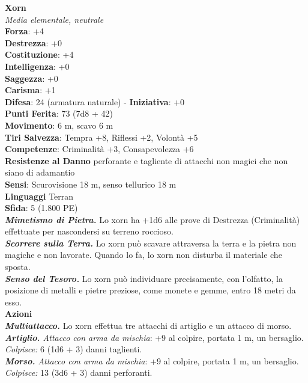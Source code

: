 \begin{multicols}{2}
\medskip\textbf{Xorn}\\
\emph{Media elementale, neutrale}\\
\textbf{Forza}: +4\\
\textbf{Destrezza}: +0\\
\textbf{Costituzione}: +4\\
\textbf{Intelligenza}: +0\\
\textbf{Saggezza}: +0\\
\textbf{Carisma}: +1\\
\textbf{Difesa}: 24 (armatura naturale) - \textbf{Iniziativa}: +0\\
\textbf{Punti Ferita}: 73 (7d8 + 42)\\
\textbf{Movimento}: 6 m, scavo 6 m\\
\textbf{Tiri Salvezza}: Tempra +8, Riflessi +2, Volontà +5\\
\textbf{Competenze}: Criminalità +3, Consapevolezza +6\\
\textbf{Resistenze al Danno} perforante e tagliente di attacchi non magici che non siano di adamantio\\
\textbf{Sensi}: Scurovisione 18 m, senso tellurico 18 m\\
\textbf{Linguaggi} Terran\\
\textbf{Sfida}: 5 (1.800 PE)\smallskip\\
\emph{\textbf{Mimetismo di Pietra.}} Lo xorn ha +1d6 alle prove di Destrezza (Criminalità) effettuate per nascondersi su terreno roccioso.\\
\emph{\textbf{Scorrere sulla Terra.}} Lo xorn può scavare attraversa la terra e la pietra non magiche e non lavorate. Quando lo fa, lo xorn non disturba il materiale che sposta.\\
\emph{\textbf{Senso del Tesoro.}} Lo xorn può individuare precisamente, con l'olfatto, la posizione di metalli e pietre preziose, come monete e gemme, entro 18 metri da esso.\\
\smallskip\textbf{Azioni}\\
\emph{\textbf{Multiattacco.}} Lo xorn effettua tre attacchi di artiglio e un attacco di morso.\\
\emph{\textbf{Artiglio.} Attacco con arma da mischia}: +9 al colpire, portata 1 m, un bersaglio.\\
\emph{Colpisce:} 6 (1d6 + 3) danni taglienti.\\
\emph{\textbf{Morso.} Attacco con arma da mischia}: +9 al colpire, portata 1 m, un bersaglio.\\
\emph{Colpisce:} 13 (3d6 + 3) danni perforanti.\\

\end{multicols}
